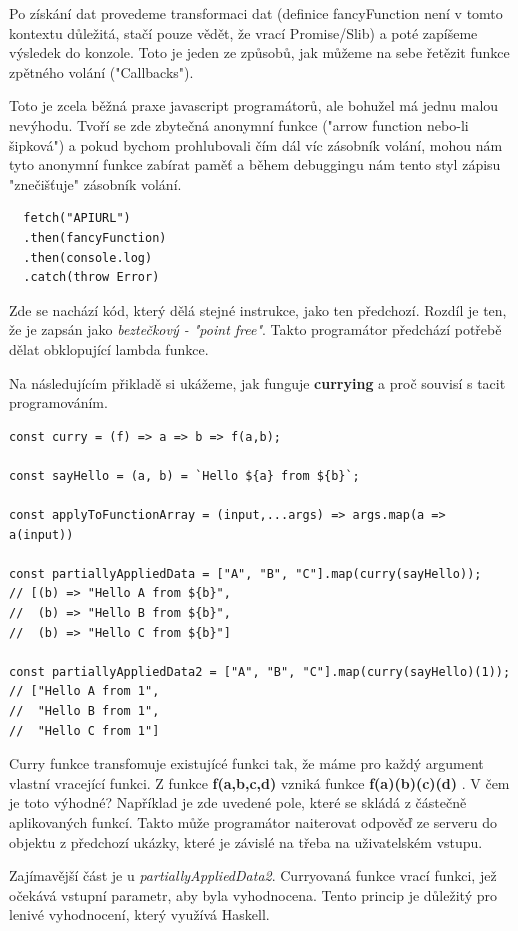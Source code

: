 \documentclass[male,czech]{kithesis}
\begin{document}
Po získání dat provedeme transformaci dat (definice fancyFunction není v tomto kontextu důležitá, stačí pouze vědět, že vrací Promise/Slib) a poté zapíšeme výsledek do konzole. 
Toto je jeden ze způsobů, jak můžeme na sebe řetězit funkce zpětného volání ("Callbacks").

Toto je zcela běžná praxe javascript programátorů, ale bohužel má jednu malou nevýhodu.
Tvoří se zde zbytečná anonymní funkce ("arrow function nebo-li šipková") a pokud bychom prohlubovali čím dál víc 
zásobník volání, mohou nám tyto anonymní funkce zabírat paměť a během debuggingu nám tento styl zápisu "znečišťuje" 
zásobník volání. 

\begin{verbatim}
  fetch("APIURL")
  .then(fancyFunction)
  .then(console.log)
  .catch(throw Error)
\end{verbatim}

Zde se nachází kód, který dělá stejné instrukce, jako ten předchozí. Rozdíl je ten, že je zapsán jako \textit{beztečkový - "point free"}.
Takto programátor předchází potřebě dělat obklopující lambda funkce.

Na následujícím přikladě si ukážeme, jak funguje \textbf{currying} a proč souvisí s tacit programováním.

\begin{verbatim}
const curry = (f) => a => b => f(a,b);

const sayHello = (a, b) = `Hello ${a} from ${b}`;

const applyToFunctionArray = (input,...args) => args.map(a => a(input))

const partiallyAppliedData = ["A", "B", "C"].map(curry(sayHello)); 
// [(b) => "Hello A from ${b}", 
//  (b) => "Hello B from ${b}", 
//  (b) => "Hello C from ${b}"]

const partiallyAppliedData2 = ["A", "B", "C"].map(curry(sayHello)(1)); 
// ["Hello A from 1", 
//  "Hello B from 1", 
//  "Hello C from 1"]
\end{verbatim}

Curry funkce transfomuje existujícé funkci tak, že máme pro každý argument vlastní vracející funkci. Z 
funkce \textbf{f(a,b,c,d)} vzniká funkce \textbf{f(a)(b)(c)(d)} \cite{Currying}. V čem je toto výhodné?
Například je zde uvedené pole, které se skládá z částečně aplikovaných funkcí. 
Takto může programátor naiterovat odpověď ze serveru do objektu z předchozí ukázky, které je závislé na třeba na uživatelském vstupu. 

Zajímavější část je u \textit{partiallyAppliedData2}. Curryovaná funkce vrací 
funkci, jež očekává vstupní parametr, aby byla vyhodnocena. Tento princip je důležitý
pro lenivé vyhodnocení, který využívá Haskell.
\end{document}
